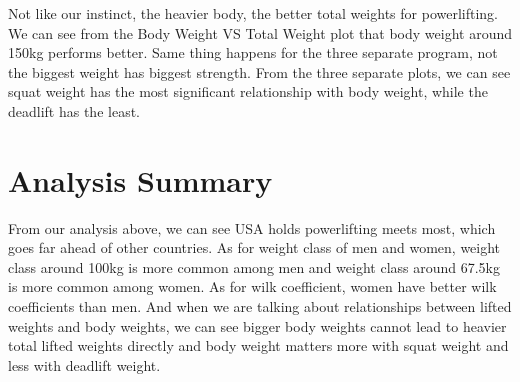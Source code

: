 \documentclass{article}
\begin{document}
Not like our instinct, the heavier body, the better total weights for powerlifting. We can see from the Body Weight VS Total Weight plot that body weight around 150kg performs better. Same thing happens for the three separate program, not the biggest weight has biggest strength. From the three separate plots, we can see squat weight has the most significant relationship with body weight, while the deadlift has the least.



\section{Analysis Summary}

From our analysis above, we can see USA holds powerlifting meets most, which goes far ahead of other countries. As for weight class of men and women, weight class around 100kg is more common among men and weight class around 67.5kg is more common among women. As for wilk coefficient, women have better wilk coefficients than men. And when we are talking about relationships between lifted weights and body weights, we can see bigger body weights cannot lead to heavier total lifted weights directly and body weight matters more with squat weight and less with deadlift weight.
\end{document}
